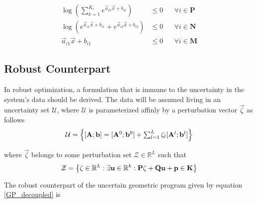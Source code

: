 \begin{equation}
\begin{aligned}
\log(\textstyle{\sum}_{k=1}^{K_i}e^{\vec{a}_{ik}\vec{x} + b_{ik}}) &\leq 0 &&\forall i \in \mathbf{P} \\
\log(e^{\vec{a}_{i1}\vec{x} + b_{i1}} + e^{\vec{a}_{i2}\vec{x} + b_{i2}}) &\leq 0 &&\forall i \in \mathbf{N} \\
\vec{a}_{i1}\vec{x} + b_{i1} &\leq 0 &&\forall i \in \mathbf{M}
\end{aligned}
\label{GP_convex}
\end{equation}
\subsection{Robust Counterpart}
In robust optimization, a formulation that is immune to the uncertainty in the system's
data should be derived. The data will be assumed living in an uncertainty set $\mathcal{U}$, where $\mathcal{U}$
is parameterized affinly by a perturbation vector $\vec{\zeta}$ as follows
\begin{equation}
\mathcal{U} = \left\{[\mathbf{A};\mathbf{b}] = [\mathbf{A}^0;\mathbf{b}^0] + \textstyle{\sum_{l=1}^{L}\zeta_l[\mathbf{A}^l;\mathbf{b}^l]}\right\}
\label{Data}
\end{equation}

where $\vec{\zeta}$ belongs to some perturbation set $\mathcal{Z} \in \mathbb{R}^L$ such that
\begin{equation}
\mathcal{Z} = \left\{ \mathbf{\zeta} \in \mathbb{R}^L: \exists \mathbf{u} \in \mathbb{R}^k:\mathbf{P}\mathbf{\zeta} + \mathbf{Q}\mathbf{u} + \mathbf{p} \in \textbf{K} \right\}
\label{perturbation_set}
\end{equation}

The robust counterpart of the uncertain geometric program given by equation \eqref{GP_decoupled} is

